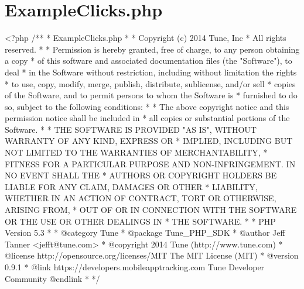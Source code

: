 \hypertarget{ExampleClicks_8php-example}{\section{Example\-Clicks.\-php}
}

\begin{DoxyCodeInclude}
<?php\textcolor{comment}{}
\textcolor{comment}{/**}
\textcolor{comment}{ * ExampleClicks.php}
\textcolor{comment}{ *}
\textcolor{comment}{ * Copyright (c) 2014 Tune, Inc}
\textcolor{comment}{ * All rights reserved.}
\textcolor{comment}{ *}
\textcolor{comment}{ * Permission is hereby granted, free of charge, to any person obtaining a copy}
\textcolor{comment}{ * of this software and associated documentation files (the "Software"), to deal}
\textcolor{comment}{ * in the Software without restriction, including without limitation the rights}
\textcolor{comment}{ * to use, copy, modify, merge, publish, distribute, sublicense, and/or sell}
\textcolor{comment}{ * copies of the Software, and to permit persons to whom the Software is}
\textcolor{comment}{ * furnished to do so, subject to the following conditions:}
\textcolor{comment}{ *}
\textcolor{comment}{ * The above copyright notice and this permission notice shall be included in}
\textcolor{comment}{ * all copies or substantial portions of the Software.}
\textcolor{comment}{ *}
\textcolor{comment}{ * THE SOFTWARE IS PROVIDED "AS IS", WITHOUT WARRANTY OF ANY KIND, EXPRESS OR}
\textcolor{comment}{ * IMPLIED, INCLUDING BUT NOT LIMITED TO THE WARRANTIES OF MERCHANTABILITY,}
\textcolor{comment}{ * FITNESS FOR A PARTICULAR PURPOSE AND NON-INFRINGEMENT. IN NO EVENT SHALL THE}
\textcolor{comment}{ * AUTHORS OR COPYRIGHT HOLDERS BE LIABLE FOR ANY CLAIM, DAMAGES OR OTHER}
\textcolor{comment}{ * LIABILITY, WHETHER IN AN ACTION OF CONTRACT, TORT OR OTHERWISE, ARISING FROM,}
\textcolor{comment}{ * OUT OF OR IN CONNECTION WITH THE SOFTWARE OR THE USE OR OTHER DEALINGS IN}
\textcolor{comment}{ * THE SOFTWARE.}
\textcolor{comment}{ *}
\textcolor{comment}{ * PHP Version 5.3}
\textcolor{comment}{ *}
\textcolor{comment}{ * @category  Tune}
\textcolor{comment}{ * @package   Tune\_PHP\_SDK}
\textcolor{comment}{ * @author    Jeff Tanner <jefft@tune.com>}
\textcolor{comment}{ * @copyright 2014 Tune (http://www.tune.com)}
\textcolor{comment}{ * @license   http://opensource.org/licenses/MIT The MIT License (MIT)}
\textcolor{comment}{ * @version   0.9.1}
\textcolor{comment}{ * @link      https://developers.mobileapptracking.com Tune Developer Community @endlink}
\textcolor{comment}{ *}
\textcolor{comment}{ */}


\end{DoxyCodeInclude}
